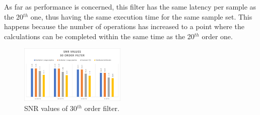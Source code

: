As far as performance is concerned, this filter has the same latency per sample as the 20$^{th}$ one, thus having the same execution time for the same sample set. This happens because the number of operations has increased to a point where the calculations can be completed within the same time as the 20$^{th}$ order one.


\begin{figure}[htpb]
	\centering
	\includegraphics[width=0.45\textwidth]{../Images/FIR_30_Order/snr_values.png}
	\caption{SNR values of 30$^{th}$ order filter.}
	\label{fig:fir_30_snr}
\end{figure}

